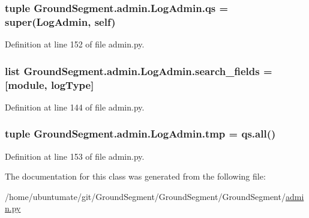 \subsubsection[{qs}]{\setlength{\rightskip}{0pt plus 5cm}tuple Ground\+Segment.\+admin.\+Log\+Admin.\+qs = super({\bf Log\+Admin}, self)\hspace{0.3cm}{\ttfamily [static]}}\label{class_ground_segment_1_1admin_1_1_log_admin_ab30bff8bf9257f4f38a07a1a0cb2f708}


Definition at line 152 of file admin.\+py.

\hypertarget{class_ground_segment_1_1admin_1_1_log_admin_ae4e75207a6f7a882014da7f3fb13e007}{}
\subsubsection[{search\+\_\+fields}]{\setlength{\rightskip}{0pt plus 5cm}list Ground\+Segment.\+admin.\+Log\+Admin.\+search\+\_\+fields = \mbox{[}\textquotesingle{}module\textquotesingle{}, \textquotesingle{}log\+Type\textquotesingle{}\mbox{]}\hspace{0.3cm}{\ttfamily [static]}}\label{class_ground_segment_1_1admin_1_1_log_admin_ae4e75207a6f7a882014da7f3fb13e007}


Definition at line 144 of file admin.\+py.

\hypertarget{class_ground_segment_1_1admin_1_1_log_admin_a3446b8c0fd9063654839bc4b13498736}{}
\subsubsection[{tmp}]{\setlength{\rightskip}{0pt plus 5cm}tuple Ground\+Segment.\+admin.\+Log\+Admin.\+tmp = qs.\+all()\hspace{0.3cm}{\ttfamily [static]}}\label{class_ground_segment_1_1admin_1_1_log_admin_a3446b8c0fd9063654839bc4b13498736}


Definition at line 153 of file admin.\+py.



The documentation for this class was generated from the following file\+:\begin{DoxyCompactItemize}
\item 
/home/ubuntumate/git/\+Ground\+Segment/\+Ground\+Segment/\+Ground\+Segment/\hyperlink{admin_8py}{admin.\+py}\end{DoxyCompactItemize}

